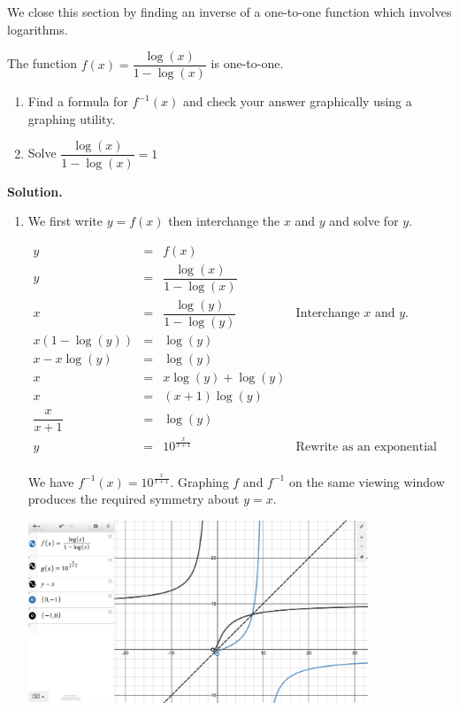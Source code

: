 \smallskip

We close this section by finding an inverse of a one-to-one function which involves logarithms.

\begin{ex}  \label{logfracinverse} The function $f(x) = \dfrac{\log(x)}{1-\log(x)}$ is one-to-one. 

\begin{enumerate}

\item  Find a formula for $f^{-1}(x)$ and check your answer graphically using a graphing utility.

\item Solve  $\dfrac{\log(x)}{1-\log(x)} = 1$

\end{enumerate}

{\bf Solution.} \begin{enumerate} \item  We first write $y=f(x)$ then interchange the $x$ and $y$ and solve for $y$.

\[ \begin{array}{rclr}
y & = & f(x) & \\ 
y  & = & \dfrac{\log(x)}{1-\log(x)} & \\[8pt]
x  & = & \dfrac{\log(y)}{1-\log(y)} & \text{Interchange $x$ and $y$.}\\[8pt]
x\left(1-\log(y)\right) & = & \log(y) & \\ 
x - x\log(y)  & = & \log(y) & \\ 
x & = & x \log(y) + \log(y) & \\ 
x & = & (x+1) \log(y) & \\ 
\dfrac{x}{x+1}  & = & \log(y) & \\ 
y & = & 10^{\frac{x}{x+1}} & \text{Rewrite as an exponential equation.}\\

\end{array}\]



We have $f^{-1}(x) = 10^{\frac{x}{x+1}}$.  Graphing $f$ and $f^{-1}$ on the same viewing window produces the required symmetry about $y=x$.

\begin{center}

\includegraphics[width=4in]{./LogarithmicEquationsandInequalitiesGraphics/LogEqnEx11.jpg}


\end{center}
\end{enumerate}
\end{ex}

